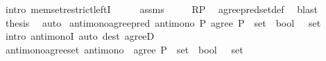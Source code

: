 \begin{isabellebody}
\ {\isacharparenleft}{\kern0pt}intro\ mem{\isacharunderscore}{\kern0pt}set{\isacharunderscore}{\kern0pt}restrict{\isacharunderscore}{\kern0pt}leftI{\isacharparenright}{\kern0pt}\isanewline
\ \ \isamarkupfalse%
\ \isamarkupfalse%
\ assms{\isacharparenleft}{\kern0pt}{}{\isacharcomma}{\kern0pt}\ {}{\isacharminus}{\kern0pt}{}{\isacharparenright}{\kern0pt}\ \isamarkupfalse%
\ {\isachardoublequoteopen}{\isachardot}{\kern0pt}{\isachardot}{\kern0pt}{\isachardot}{\kern0pt}\ {\isacharequal}{\kern0pt}\ R{\isacharprime}{\kern0pt}{\isasymrestriction}\isactrlbsub P\isactrlesub {\isachardoublequoteclose}\ \isamarkupfalse%
\ agree{\isacharunderscore}{\kern0pt}pred{\isacharunderscore}{\kern0pt}set{\isacharunderscore}{\kern0pt}def\ \isamarkupfalse%
\ blast\isanewline
\ \ \isamarkupfalse%
\ \isamarkupfalse%
\ {\isacharquery}{\kern0pt}thesis\ \isamarkupfalse%
\ auto\isanewline
{}\isamarkupfalse%
%
\endisatagproof
{\isafoldproof}%
%
\isadelimproof
\isanewline
%
\endisadelimproof
\isanewline
{}\isamarkupfalse%
\ antimono{\isacharunderscore}{\kern0pt}agree{\isacharunderscore}{\kern0pt}pred{\isacharcolon}{\kern0pt}\ {\isachardoublequoteopen}antimono\ {\isacharparenleft}{\kern0pt}{\isasymlambda}P{\isachardot}{\kern0pt}\ agree\ {\isacharparenleft}{\kern0pt}P\ {\isacharcolon}{\kern0pt}{\isacharcolon}{\kern0pt}\ set\ {\isasymRightarrow}\ bool{\isacharparenright}{\kern0pt}\ {\isacharparenleft}{\kern0pt}{\isasymR}\ {\isacharcolon}{\kern0pt}{\isacharcolon}{\kern0pt}\ set{\isacharparenright}{\kern0pt}{\isacharparenright}{\kern0pt}{\isachardoublequoteclose}\isanewline
%
\isadelimproof
\ \ %
\endisadelimproof
%
\isatagproof
{}\isamarkupfalse%
\ {\isacharparenleft}{\kern0pt}intro\ antimonoI{\isacharparenright}{\kern0pt}\ {\isacharparenleft}{\kern0pt}auto\ dest{\isacharcolon}{\kern0pt}\ agreeD{\isacharparenright}{\kern0pt}%
\endisatagproof
{\isafoldproof}%
%
\isadelimproof
\isanewline
%
\endisadelimproof
\isanewline
{}\isamarkupfalse%
\ antimono{\isacharunderscore}{\kern0pt}agree{\isacharunderscore}{\kern0pt}set{\isacharcolon}{\kern0pt}\ {\isachardoublequoteopen}antimono\ {\isacharparenleft}{\kern0pt}{\isasymlambda}{\isasymR}{\isachardot}{\kern0pt}\ agree\ {\isacharparenleft}{\kern0pt}P\ {\isacharcolon}{\kern0pt}{\isacharcolon}{\kern0pt}\ set\ {\isasymRightarrow}\ bool{\isacharparenright}{\kern0pt}\ {\isacharparenleft}{\kern0pt}{\isasymR}\ {\isacharcolon}{\kern0pt}{\isacharcolon}{\kern0pt}\ set{\isacharparenright}{\kern0pt}{\isacharparenright}{\kern0pt}{\isachardoublequoteclose}\isanewline

\end{isabellebody}
